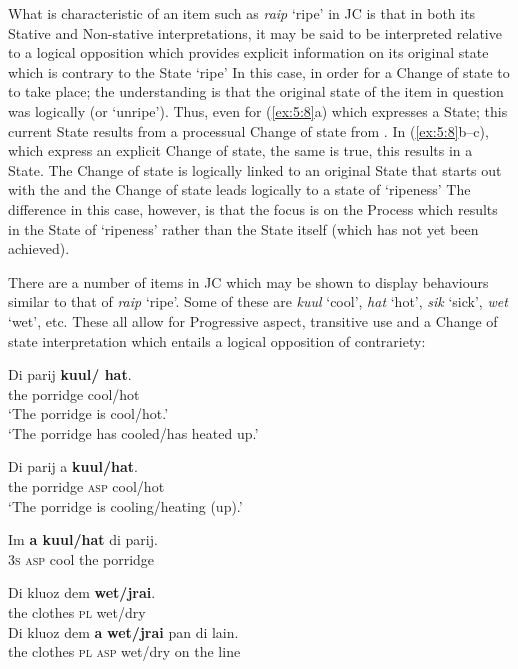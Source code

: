 What is characteristic of an item such as \textit{raip} `ripe' in JC is that in both its Stative and Non-stative interpretations, it may be said to be interpreted relative to a logical opposition which provides explicit information on its original state which is contrary to the State `ripe' In this case, in order for a Change of state to \RIPE to take place; the understanding is that the original state of the item in question was logically \GREEN (or `unripe'). Thus, even for (\ref{ex:5:8}a) which expresses a State; this current State results from a processual Change of state from \GREEN. In (\ref{ex:5:8}b--c), which express an explicit Change of state, the same is true, this results in a State. The Change of state is logically linked to an original State that starts out with the \GREEN and the Change of state leads logically to a state of `ripeness' The difference in this case, however, is that the focus is on the Process which results in the State of `ripeness' rather than the State itself (which has not yet been achieved). 

There are a number of items in JC which may be shown to display behaviours similar to that of \textit{raip} `ripe'. Some of these are \textit{kuul} `cool', \textit{hat} `hot', \textit{sik} `sick', \textit{wet} `wet', etc. These all allow for Progressive aspect, transitive use and a Change of state interpretation which entails a logical opposition of contrariety: 

\ea%
 \label{ex:5:9}
\ea 
\gll Di parij \textbf{{kuul/ hat}}.\\
 the porridge cool/hot\\
\ea `{{The porridge is cool\slash hot.'}}\\
\ex `{The porridge has cooled\slash has heated up}.' \\
\z

\ex 
\gll Di parij a \textbf{{kuul/hat}}.\\
 the porridge \textsc{asp} cool/hot\\
\glt `{The porridge is cooling\slash heating (up).'}

\ex 
\gll Im \textbf{{a kuul/hat}} di parij. \\
 \textsc{3s} \textsc{asp} cool the porridge\\
 \z
\z

\ea
\label{ex:5:10}
\ea 
\gll Di kluoz dem \textbf{wet/jrai}.\\
 the clothes {\textsc{pl}} wet/dry\\
\z
\ex 
\gll Di kluoz dem \textbf{a} \textbf{wet/jrai} pan di lain.\\
 the clothes {\textsc{pl}} \textsc{asp} wet/dry on the line\\

